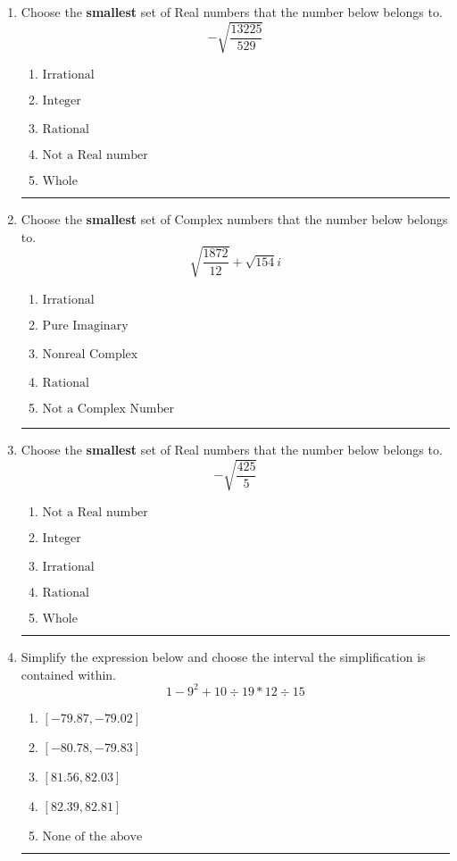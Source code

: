 \documentclass[14pt]{extbook}
\newcommand{\litem}[1]{\item#1\hspace*{-1cm}\rule{\textwidth}{0.4pt}}
\begin{document}
\begin{enumerate}
\litem{
Choose the \textbf{smallest} set of Real numbers that the number below belongs to.\[ -\sqrt{\frac{13225}{529}} \]\begin{enumerate}[label=\Alph*.]
\item \( \text{Irrational} \)
\item \( \text{Integer} \)
\item \( \text{Rational} \)
\item \( \text{Not a Real number} \)
\item \( \text{Whole} \)

\end{enumerate} }
\litem{
Choose the \textbf{smallest} set of Complex numbers that the number below belongs to.\[ \sqrt{\frac{1872}{12}}+\sqrt{154} i \]\begin{enumerate}[label=\Alph*.]
\item \( \text{Irrational} \)
\item \( \text{Pure Imaginary} \)
\item \( \text{Nonreal Complex} \)
\item \( \text{Rational} \)
\item \( \text{Not a Complex Number} \)

\end{enumerate} }
\litem{
Choose the \textbf{smallest} set of Real numbers that the number below belongs to.\[ -\sqrt{\frac{425}{5}} \]\begin{enumerate}[label=\Alph*.]
\item \( \text{Not a Real number} \)
\item \( \text{Integer} \)
\item \( \text{Irrational} \)
\item \( \text{Rational} \)
\item \( \text{Whole} \)

\end{enumerate} }
\litem{
Simplify the expression below and choose the interval the simplification is contained within.\[ 1 - 9^2 + 10 \div 19 * 12 \div 15 \]\begin{enumerate}[label=\Alph*.]
\item \( [-79.87, -79.02] \)
\item \( [-80.78, -79.83] \)
\item \( [81.56, 82.03] \)
\item \( [82.39, 82.81] \)
\item \( \text{None of the above} \)


\end{enumerate}}
\end{enumerate}
\end{document}
